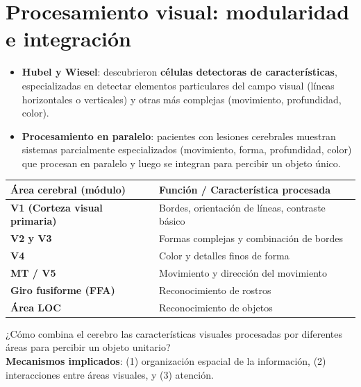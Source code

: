 \documentclass[11pt,a4paper]{article}
\begin{document}
\section{Procesamiento visual: modularidad e integración}

\begin{itemize}
  \item \textbf{Hubel y Wiesel}: descubrieron \textbf{células detectoras de características}, especializadas en detectar elementos particulares del campo visual (líneas horizontales o verticales) y otras más complejas (movimiento, profundidad, color).
  \item \textbf{Procesamiento en paralelo}: pacientes con lesiones cerebrales muestran sistemas parcialmente especializados (movimiento, forma, profundidad, color) que procesan en paralelo y luego se integran para percibir un objeto único.
\end{itemize}

\begin{center}
\begin{tabular}{@{} >{\bfseries}l l @{}}
\toprule
\rowcolor{Primary}
\color{white}Área cerebral (módulo) & \color{white}\textbf{Función / Característica procesada} \\
\midrule
V1 (Corteza visual primaria) & Bordes, orientación de líneas, contraste básico \\
V2 y V3 & Formas complejas y combinación de bordes \\
V4 & Color y detalles finos de forma \\
MT / V5 & Movimiento y dirección del movimiento \\
Giro fusiforme (FFA) & Reconocimiento de rostros \\
Área LOC & Reconocimiento de objetos \\
\bottomrule
\end{tabular}
\end{center}

\begin{cajaClave}[title={El problema de la integración (\emph{binding problem})}]
¿Cómo combina el cerebro las características visuales procesadas por diferentes áreas para percibir un objeto unitario?\\
\textbf{Mecanismos implicados}: (1) organización espacial de la información, (2) interacciones entre áreas visuales, y (3) atención.
\end{cajaClave}
\end{document}
